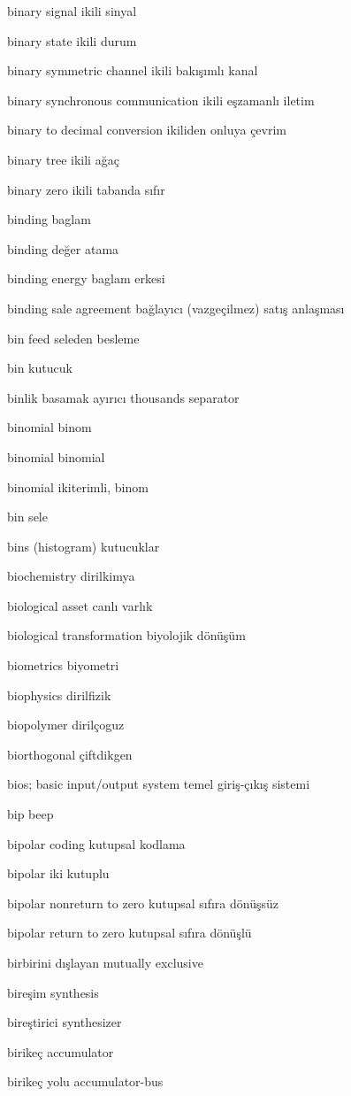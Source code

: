 \documentclass[12pt,fleqn]{article}\usepackage{../../common}
\begin{document}
binary signal ikili sinyal

binary state ikili durum

binary symmetric channel ikili bakışımlı kanal

binary synchronous communication ikili eşzamanlı iletim

binary to decimal conversion ikiliden onluya çevrim

binary tree ikili ağaç

binary zero ikili tabanda sıfır

binding baglam

binding değer atama

binding energy baglam erkesi

binding sale agreement bağlayıcı (vazgeçilmez) satış anlaşması

bin feed seleden besleme

bin kutucuk

binlik basamak ayırıcı thousands separator

binomial binom

binomial binomial

binomial ikiterimli, binom

bin sele

bins (histogram) kutucuklar

biochemistry dirilkimya

biological asset canlı varlık

biological transformation biyolojik dönüşüm

biometrics biyometri

biophysics dirilfizik

biopolymer dirilçoguz

biorthogonal çiftdikgen

bios; basic input/output system temel giriş-çıkış sistemi

bip beep

bipolar coding kutupsal kodlama

bipolar iki kutuplu

bipolar nonreturn to zero kutupsal sıfıra dönüşsüz

bipolar return to zero kutupsal sıfıra dönüşlü

birbirini dışlayan mutually exclusive

bireşim synthesis

bireştirici synthesizer

birikeç accumulator

birikeç yolu accumulator-bus
\end{document}

